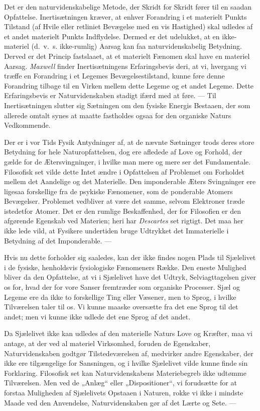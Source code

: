 \documentclass[12pt,a4paper]{book}
\newcommand{\opage}[1]{\marginnote{\footnotesize\textit{[#1]}}}
\begin{document}
Det er den naturvidenskabelige Metode, der Skridt for Skridt fører til
en saadan Opfattelse. Inertisætningen kræver, at enhver Forandring i
et materielt Punkts Tilstand (af Hvile eller retliniet Bevægelse med
en vis Hastighed) skal udledes af et andet materielt Punkts
Indflydelse. Dermed er det udelukket, at en ikke-materiel (d.\ v.\ s.
ikke-rumlig) Aarsag kan faa naturvidenskabelig Betydning. Derved er det
Princip fastslaaet, at et materielt Fænomen skal have en materiel
Aarsag. \emph{Maxwell} finder Inertisætningens Erfaringsbevis deri, at
vi, hvergang vi træffe en Forandring i et Legemes Bevægelsestilstand,
kunne føre denne Forandring tilbage til en Virken mellem dette Legeme
og et andet Legeme. Dette Erfaringsbevis er Naturvidenskaben stadigt
ifærd med at føre. --- Til Inertisætningen slutter sig Sætningen om
den fysiske Energis Bestaaen, der som allerede omtalt synes at maatte
fastholdes ogsaa for den organiske Naturs Vedkommende.

Der er i vor Tids Fysik Antydninger af, at de nævnte Sætninger trods
deres store Betydning for hele Naturopfattelsen, dog ere afledede af
Love og Forhold, der gælde for de Ætersvingninger, i hvilke man mere
og mere ser det Fundamentale. Filosofisk set vilde dette Intet ændre i
Opfattelsen af Problemet om Forholdet mellem det Aandelige og det
Materielle. Den imponderable Æters Svingninger ere ligesaa forskellige
fra de psykiske Fænomener, som de ponderable Atomers Bevægelser.
Problemet vedbliver at være det samme, selvom Elektroner træde
istedetfor Atomer. Det er den \opage{32} rumlige Beskaffenhed, der for Filosofien
er den afgørende Egenskab ved Materien; heri har \emph{Descartes} set
rigtigt. Det maa her ikke lede vild, at Fysikere undertiden bruge
Udtrykket det Immaterielle i Betydning af det Imponderable. ---

Hvis nu dette forholder sig saaledes, kan der ikke findes nogen Plads
til Sjælelivet i de fysiske, henholdsvis fysiologiske Fænomeners
Række. Den eneste Mulighed bliver da den Opfattelse, at vi i
Sjælelivet have det Udtryk, Selviagttagelsen giver os for, hvad der for
vore Sanser fremtræder som organiske Processer. Sjæl og Legeme ere da
ikke to forskellige Ting eller Væsener, men to Sprog, i hvilke
Tilværelsen taler til os. Vi kunne maaske oversætte fra det ene Sprog
til det andet; men vi kunne ikke udlede det ene Sprog af det andet.

Da Sjælelivet ikke kan udledes af den materielle Naturs Love og
Kræfter, maa vi antage, at der ved al materiel Virksomhed, foruden de
Egenskaber, Naturvidenskaben godtgør Tilstedeværelsen af, medvirker
andre Egenskaber, der ikke ere tilgængelige for Sansningen, og i hvilke
Sjælelivet vilde kunne finde sin Forklaring. Filosofisk set kan
Naturvidenskabens Materiebegreb ikke udtømme Tilværelsen. Men ved de
„Anlæg“ eller „Dispositioner“, vi forudsætte for at forstaa
Muligheden af Sjælelivets Opstaaen i Naturen, rokke vi ikke i mindste
Maade ved den Anvendelse, Naturvidenskaben gør af det Lærte og Sete. ---
\end{document}
